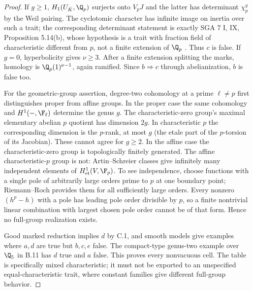 \begin{proof}
If $g\ge1$, $H_1(U_{\bar K},\Q_p)$ surjects onto $V_pJ$ and the latter
has determinant $\chi_p^g$ by the Weil pairing. The cyclotomic character
has infinite image on inertia over such a trait; the corresponding
determinant statement is exactly SGA 7 I, IX, Proposition 5.14(b), whose
hypothesis is a trait with fraction field of characteristic different from
$p$, not a finite extension of $\Q_p$
\citep{BC_SGA7}. Thus $c$ is false. If $g=0$, hyperbolicity gives
$\nu\ge3$. After a finite extension splitting the marks, homology is
$\Q_p(1)^{\nu-1}$, again ramified. Since $b\Rightarrow c$ through
abelianization, $b$ is false too.

For the geometric-group assertion, degree-two cohomology at a prime
$\ell\ne p$ first distinguishes proper from affine groups. In the proper
case the same cohomology and $H^1(-,\F_\ell)$ determine the genus $g$.
The characteristic-zero group's maximal elementary abelian $p$ quotient
has dimension $2g$. In characteristic $p$ the corresponding dimension is
the $p$-rank, at most $g$ (the etale part of the $p$-torsion of its
Jacobian). These cannot agree for $g\ge2$. In the affine case the
characteristic-zero group is topologically finitely generated. The affine
characteristic-$p$ group is not: Artin--Schreier classes give infinitely many
independent elements of $H^1_{\rm et}(V,\F_p)$. To see independence, choose
functions with a single pole of arbitrarily large orders prime to $p$ at
one boundary point; Riemann--Roch provides them for all sufficiently large
orders. Every nonzero $(h^p-h)$ with a pole has leading pole order divisible
by $p$, so a finite nontrivial linear combination with largest chosen pole
order cannot be of that form. Hence no full-group realization exists.

Good marked reduction implies $d$ by C.1, and smooth models give examples
where $a,d$ are true but $b,c,e$ false. The compact-type genus-two example
over $\Q_5$ in B.11 has $d$ true and $a$ false. This proves every
nonvacuous cell. The table is specifically mixed characteristic;
it must not be exported to an unspecified equal-characteristic
trait, where constant families give different full-group behavior.
\end{proof}

